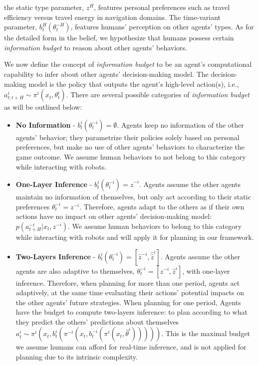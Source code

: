 \documentclass[letterpaper, 10 pt, conference]{ieeeconf}  %
\begin{document}
the static type parameter, $z^H$, features personal preferences such as travel efficiency versus travel energy in navigation domains. The time-variant parameter, $b^H_t(\theta^{-H}_t)$, features humans' perception on other agents' types. As for the detailed form in the belief, we hypothesize that humans possess certain \textit{information budget} to reason about other agents' behaviors.

We now define the concept of \textit{information budget} to be an agent's computational capability to infer about other agents' decision-making model. The decision-making model is the policy that outputs the agent's high-level action(s), i.e., $a^i_{t:t+H} \sim \pi^i(x_t,\theta^i_t)$. There are several possible categories of \textit{information budget} as will be outlined below:

\begin{itemize}
	\item \textbf{No Information} - $b^i_t(\theta^{-i}_t) = \emptyset$. Agents keep no information of the other agents' behavior; they parametrize their policies solely based on personal preferences, but make no use of other agents' behaviors to characterize the game outcome. We assume human behaviors to not belong to this category while interacting with robots.
	\item \textbf{One-Layer Inference} - $b^i_t(\theta^{-i}_t) = \hat{z}^{-i}$. Agents assume the other agents maintain no information of themselves, but only act according to their static preferences $\theta^{-i}_t = z^{-i}$. Therefore, agents adapt to the others as if their own actions have no impact on other agents' decision-making model: $p(a^{-i}_{t+H}|x_t, z^{-i})$. We assume human behaviors to belong to this category while interacting with robots and will apply it for planning in our framework.
	\item \textbf{Two-Layers Inference} - $b^i_t(\theta^{-i}_t) = [\hat{z}^{-i}, \hat{\hat{z}}^i]$. Agents assume the other agents are also adaptive to themselves,
	$\theta^{-i}_t = [z^{-i}, \hat{z}^{i}]$, with one-layer inference. Therefore, when planning for more than one period, agents act adaptively, at the same time evaluating their actions' potential impacts on the other agents' future strategies. When planning for one period, Agents have the budget to compute two-layers inference: to plan according to what they predict the others' predictions about themselves $a^i_t \sim \pi^i(x_t, b^i_t(\pi^{-i}(x_t,b^{-i}_t(\pi^i(x_t,\hat{\theta}^i)))))$. This is the maximal budget we assume humans can afford for real-time inference, and is not applied for planning due to its intrinsic complexity. 
\end{itemize}
\end{document}

